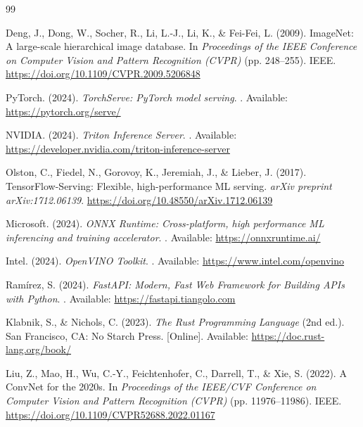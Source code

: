 \documentclass[10pt,twocolumn,a4paper]{article}
\theoremstyle{definition}
\theoremstyle{plain}
\begin{document}

\begin{thebibliography}{99}

Deng, J., Dong, W., Socher, R., Li, L.-J., Li, K., \& Fei-Fei, L. (2009).
\newblock ImageNet: A large-scale hierarchical image database.
\newblock In \textit{Proceedings of the IEEE Conference on Computer Vision and Pattern Recognition (CVPR)} (pp. 248--255). IEEE. \url{https://doi.org/10.1109/CVPR.2009.5206848}

PyTorch. (2024).
\newblock \textit{TorchServe: PyTorch model serving}.
\newblock [Online]. Available: \url{https://pytorch.org/serve/}

NVIDIA. (2024).
\newblock \textit{Triton Inference Server}.
\newblock [Online]. Available: \url{https://developer.nvidia.com/triton-inference-server}

Olston, C., Fiedel, N., Gorovoy, K., Jeremiah, J., \& Lieber, J. (2017).
\newblock TensorFlow-Serving: Flexible, high-performance ML serving.
\newblock \textit{arXiv preprint arXiv:1712.06139}. \url{https://doi.org/10.48550/arXiv.1712.06139}

Microsoft. (2024).
\newblock \textit{ONNX Runtime: Cross-platform, high performance ML inferencing and training accelerator}.
\newblock [Online]. Available: \url{https://onnxruntime.ai/}

Intel. (2024).
\newblock \textit{OpenVINO Toolkit}.
\newblock [Online]. Available: \url{https://www.intel.com/openvino}

Ramírez, S. (2024).
\newblock \textit{FastAPI: Modern, Fast Web Framework for Building APIs with Python}.
\newblock [Online]. Available: \url{https://fastapi.tiangolo.com}

Klabnik, S., \& Nichols, C. (2023).
\newblock \textit{The Rust Programming Language} (2nd ed.).
\newblock San Francisco, CA: No Starch Press. [Online]. Available: \url{https://doc.rust-lang.org/book/}

Liu, Z., Mao, H., Wu, C.-Y., Feichtenhofer, C., Darrell, T., \& Xie, S. (2022).
\newblock A ConvNet for the 2020s.
\newblock In \textit{Proceedings of the IEEE/CVF Conference on Computer Vision and Pattern Recognition (CVPR)} (pp. 11976--11986). IEEE. \url{https://doi.org/10.1109/CVPR52688.2022.01167}


\end{thebibliography}
\end{document}
